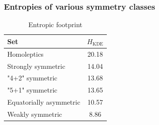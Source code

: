 \documentclass[xcolor=dvipsnames]{beamer}
\begin{document}
\begin{frame}
\begin{figure}[ht]
\begin{minipage}[b]{0.5\linewidth}
		\vspace{2ex}
	\end{minipage} 
\end{figure}
\end{frame}

\begin{frame}
\frametitle{Entropies of various symmetry classes}

\begin{table}[]
\centering
\caption{Entropic footprint}
\label{tab:ent-footprint}
\begin{tabular}{lc}
	\toprule
	Set 					     & $H_{\textrm{KDE}}$ \\
	\midrule
	Homoleptics                 & 20.18  \\[0.1cm]
	Strongly symmetric          & 14.04  \\[0.1cm]
	"4+2" symmetric             & 13.68  \\[0.1cm] 
	"5+1" symmetric             & 13.65  \\[0.1cm]
	Equatorially asymmetric     & 10.57  \\[0.1cm]
	Weakly symmetric            &  8.86  \\[0.1cm]
	\bottomrule
\end{tabular}
\end{table}
	
	
\end{frame}
\end{document}
